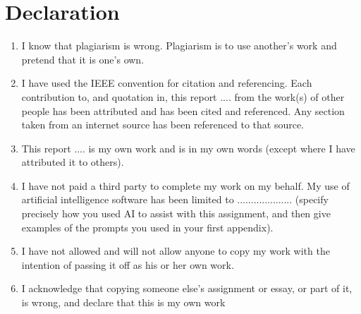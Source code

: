 {
\onehalfspacing
   
\chapter*{Declaration}

\vskip 10mm
\begin{enumerate}
    \item I know that plagiarism is wrong.
    Plagiarism is to use another’s work and pretend that it is one’s own.
    \item I have used the IEEE convention for citation and referencing.
    Each contribution to, and quotation in, this report .... from the work(s) of other people has been attributed and has been cited and referenced.
    Any section taken from an internet source has been referenced to that source.
    \item This report .... is my own work and is in my own words (except where I have attributed it to others).
    \item I have not paid a third party to complete my work on my behalf.
    My use of artificial intelligence software has been limited to .................... (specify precisely how you used AI to assist with this assignment, and then give examples of the prompts you used in your first appendix).
    \item I have not allowed and will not allow anyone to copy my work with the intention of passing it off as his or her own work.
    \item I acknowledge that copying someone else’s assignment or essay, or part of it, is wrong, and declare that this is my own work
\end{enumerate}
\vskip 30mm

\par\noindent\makebox[2.5in]{\hrulefill} \hfill\makebox[2.0in]{\hrulefill}%
\par\noindent{}      \hfill{}%

}
